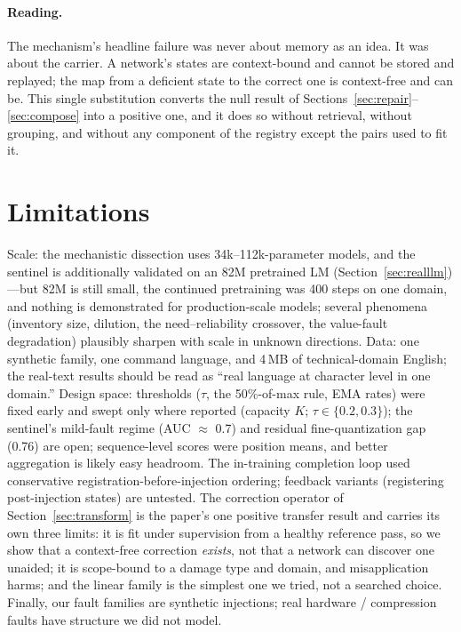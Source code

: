 \documentclass[11pt]{article}
\begin{document}
\paragraph{Reading.} The mechanism's headline failure was never about memory as
an idea. It was about the carrier. A network's states are context-bound and
cannot be stored and replayed; the map from a deficient state to the correct one
is context-free and can be. This single substitution converts the null result of
Sections~\ref{sec:repair}--\ref{sec:compose} into a positive one, and it does so
without retrieval, without grouping, and without any component of the registry
except the pairs used to fit it.

\section{Limitations}
\label{sec:limits}

Scale: the mechanistic dissection uses 34k--112k-parameter models, and the
sentinel is additionally validated on an 82M pretrained LM
(Section~\ref{sec:realllm})---but 82M is still small, the continued
pretraining was 400 steps on one domain, and nothing is demonstrated for
production-scale models; several phenomena (inventory size, dilution, the
need--reliability crossover, the value-fault degradation) plausibly sharpen
with scale in unknown directions. Data: one synthetic family, one command
language, and
4\,MB of technical-domain English; the real-text results should be read as
``real language at character level in one domain.'' Design space: thresholds
($\tau$, the 50\%-of-max rule, EMA rates) were fixed early and swept only
where reported (capacity $K$; $\tau \in \{0.2, 0.3\}$); the sentinel's mild-fault
regime (AUC $\approx$ 0.7) and residual fine-quantization gap (0.76) are open;
sequence-level scores were position means, and better aggregation is likely
easy headroom. The in-training completion loop used conservative
registration-before-injection ordering; feedback variants (registering
post-injection states) are untested. The correction operator of
Section~\ref{sec:transform} is the paper's one positive transfer result and
carries its own three limits: it is fit under supervision from a healthy
reference pass, so we show that a context-free correction \emph{exists}, not
that a network can discover one unaided; it is scope-bound to a damage type and
domain, and misapplication harms; and the linear family is the simplest one we
tried, not a searched choice. Finally, our fault families are
synthetic injections; real hardware / compression faults have structure we
did not model.
\end{document}
